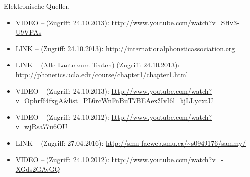 \begin{frame}[allowframebreaks]{Elektronische Quellen}
	\small
	
	\begin{itemize}
		\item VIDEO --  (Zugriff: 24.10.2013): \url{http://www.youtube.com/watch?v=SHv3-U9VPAs}
		\item LINK --  (Zugriff: 24.10.2013): \url{http://internationalphoneticassociation.org}
		\item LINK --  (Alle Laute zum Testen) (Zugriff: 24.10.2013):\\ \url{http://phonetics.ucla.edu/course/chapter1/chapter1.html}
		\item VIDEO --  (Zugriff: 24.10.2013): \url{http://www.youtube.com/watch?v=Ophrf64fxgA&list=PL6rcWnFnBuT7BEAex2IvI6l_bjLLycxaU}
		\item VIDEO --  (Zugriff: 24.10.2012): \url{http://www.youtube.com/watch?v=wjRsa77u6OU}
		\item LINK --  (Zugriff: 27.04.2016): \url{http://smu-facweb.smu.ca/~s0949176/sammy/}
		\item VIDEO --  (Zugriff: 24.10.2012): \url{http://www.youtube.com/watch?v=-XGds2GAvGQ}
	\end{itemize}
	
\end{frame}


